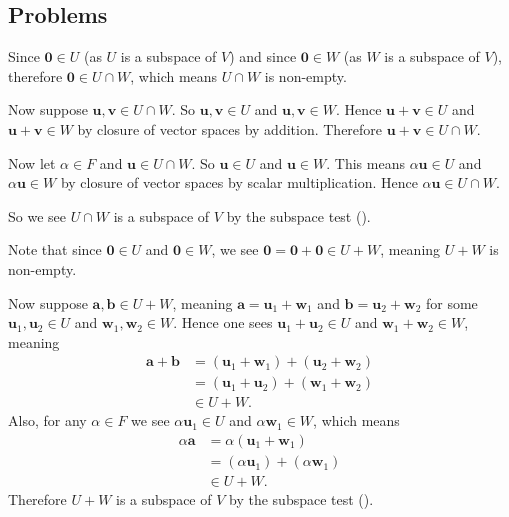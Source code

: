 \subsection*{Problems}
\begin{questions}
    \item \begin{partquestions}{\alph*}
        \item Since $\mathbf{0} \in U$ (as $U$ is a subspace of $V$) and since $\mathbf{0} \in W$ (as $W$ is a subspace of $V$), therefore $\mathbf{0} \in U \cap W$, which means $U \cap W$ is non-empty.

        Now suppose $\mathbf{u}, \mathbf{v} \in U \cap W$. So $\mathbf{u}, \mathbf{v} \in U$ and $\mathbf{u}, \mathbf{v} \in W$. Hence $\mathbf{u} + \mathbf{v} \in U$ and $\mathbf{u} + \mathbf{v} \in W$ by closure of vector spaces by addition. Therefore $\mathbf{u} + \mathbf{v} \in U \cap W$.

        Now let $\alpha \in F$ and $\mathbf{u} \in U \cap W$. So $\mathbf{u} \in U$ and $\mathbf{u} \in W$. This means $\alpha\mathbf{u} \in U$ and $\alpha\mathbf{u} \in W$ by closure of vector spaces by scalar multiplication. Hence $\alpha\mathbf{u} \in U \cap W$.

        So we see $U \cap W$ is a subspace of $V$ by the subspace test ().

        \item Note that since $\mathbf{0} \in U$ and $\mathbf{0} \in W$, we see $\mathbf{0} = \mathbf{0} + \mathbf{0} \in U + W$, meaning $U + W$ is non-empty.

        Now suppose $\mathbf{a}, \mathbf{b} \in U + W$, meaning $\mathbf{a} = \mathbf{u}_1 + \mathbf{w}_1$ and $\mathbf{b} = \mathbf{u}_2 + \mathbf{w}_2$ for some $\mathbf{u}_1, \mathbf{u}_2 \in U$ and $\mathbf{w}_1, \mathbf{w}_2 \in W$. Hence one sees $\mathbf{u}_1 + \mathbf{u}_2 \in U$ and $\mathbf{w}_1 + \mathbf{w}_2 \in W$, meaning
        \begin{align*}
            \mathbf{a} + \mathbf{b} &= (\mathbf{u}_1 + \mathbf{w}_1) + (\mathbf{u}_2 + \mathbf{w}_2)\\
            &= (\mathbf{u}_1 + \mathbf{u}_2) + (\mathbf{w}_1 + \mathbf{w}_2)\\
            &\in U + W.
        \end{align*}
        Also, for any $\alpha \in F$ we see $\alpha\mathbf{u}_1 \in U$ and $\alpha\mathbf{w}_1 \in W$, which means
        \begin{align*}
            \alpha\mathbf{a} &= \alpha(\mathbf{u}_1 + \mathbf{w}_1)\\
            &= (\alpha\mathbf{u}_1) + (\alpha\mathbf{w}_1)\\
            &\in U + W.
        \end{align*}
        Therefore $U + W$ is a subspace of $V$ by the subspace test ().
    \end{partquestions}


\end{questions}
